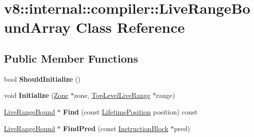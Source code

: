 \hypertarget{classv8_1_1internal_1_1compiler_1_1_live_range_bound_array}{}\section{v8\+:\+:internal\+:\+:compiler\+:\+:Live\+Range\+Bound\+Array Class Reference}
\label{classv8_1_1internal_1_1compiler_1_1_live_range_bound_array}
\subsection*{Public Member Functions}
\begin{DoxyCompactItemize}
\item 
bool {\bfseries Should\+Initialize} ()\hypertarget{classv8_1_1internal_1_1compiler_1_1_live_range_bound_array_aae40f67a2814f6a3f64e2de17a7087c6}{}\label{classv8_1_1internal_1_1compiler_1_1_live_range_bound_array_aae40f67a2814f6a3f64e2de17a7087c6}

\item 
void {\bfseries Initialize} (\hyperlink{classv8_1_1internal_1_1_zone}{Zone} $\ast$zone, \hyperlink{classv8_1_1internal_1_1compiler_1_1_top_level_live_range}{Top\+Level\+Live\+Range} $\ast$range)\hypertarget{classv8_1_1internal_1_1compiler_1_1_live_range_bound_array_aa4f5c3d190789573f46da09fb138ad4f}{}\label{classv8_1_1internal_1_1compiler_1_1_live_range_bound_array_aa4f5c3d190789573f46da09fb138ad4f}

\item 
\hyperlink{classv8_1_1internal_1_1compiler_1_1_live_range_bound}{Live\+Range\+Bound} $\ast$ {\bfseries Find} (const \hyperlink{classv8_1_1internal_1_1compiler_1_1_lifetime_position}{Lifetime\+Position} position) const \hypertarget{classv8_1_1internal_1_1compiler_1_1_live_range_bound_array_aafe4846e1e3bff62c38316de5ba0ca3c}{}\label{classv8_1_1internal_1_1compiler_1_1_live_range_bound_array_aafe4846e1e3bff62c38316de5ba0ca3c}

\item 
\hyperlink{classv8_1_1internal_1_1compiler_1_1_live_range_bound}{Live\+Range\+Bound} $\ast$ {\bfseries Find\+Pred} (const \hyperlink{classv8_1_1internal_1_1compiler_1_1_instruction_block}{Instruction\+Block} $\ast$pred)\hypertarget{classv8_1_1internal_1_1compiler_1_1_live_range_bound_array_a2c68b628f69a622da3d334048fe6a1a2}{}\label{classv8_1_1internal_1_1compiler_1_1_live_range_bound_array_a2c68b628f69a622da3d334048fe6a1a2}


\end{DoxyCompactItemize}
